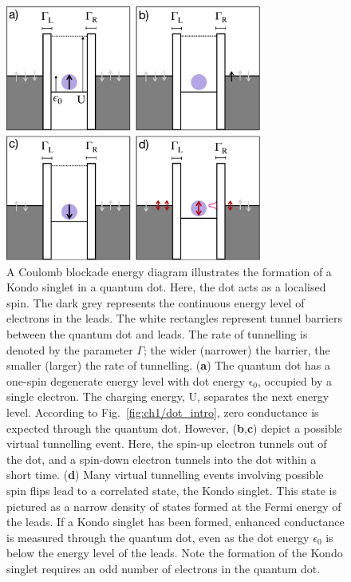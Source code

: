 \begin{figure}[!hbt]
 \begin{center}
  \includegraphics[width=0.75\textwidth]{figures/ch2/figure11.pdf}
  \caption[Kondo Effect Illustration : Quantum Dot]{\label{fig:ch2/kondo_dot_diagram} 
  A Coulomb blockade energy diagram illustrates the formation of a Kondo singlet in a quantum dot. Here, the dot acts as a localised spin. The dark grey represents the continuous energy level of electrons in the leads. The white rectangles represent tunnel barriers between the quantum dot and leads. The rate of tunnelling is denoted by the parameter $\Gamma$; the wider (narrower) the barrier, the smaller (larger) the rate of tunnelling. (\textbf{a}) The quantum dot has a one-spin degenerate energy level with dot energy $\mathrm{\epsilon_0}$, occupied by a single electron. The charging energy, $\mathrm{U}$, separates the next energy level. According to Fig.~\ref{fig:ch1/dot_intro}, zero conductance is expected through the quantum dot. However, (\textbf{b},\textbf{c}) depict a possible virtual tunnelling event. Here, the spin-up electron tunnels out of the dot, and a spin-down electron tunnels into the dot within a short time. (\textbf{d}) Many virtual tunnelling events involving possible spin flips lead to a correlated state, the Kondo singlet. This state is pictured as a narrow density of states formed at the Fermi energy of the leads. If a Kondo singlet has been formed, enhanced conductance is measured through the quantum dot, even as the dot energy $\epsilon_0$ is below the energy level of the leads. Note the formation of the Kondo singlet requires an odd number of electrons in the quantum dot.
   }
 \end{center}
\end{figure}


